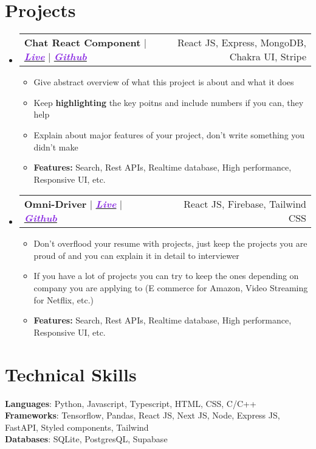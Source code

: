 \documentclass[a4paper,11pt]{article}
\makeatletter
\newcommand{\resumeItem}[1]{
  \item\small{
    {#1 \vspace{-2pt}}
  }
}
\newcommand{\resumeProjectHeading}[2]{
    \item
    \begin{tabular*}{1\textwidth}{l@{\extracolsep{\fill}}r}
      \small#1 & #2 \\
    \end{tabular*}\vspace{-7pt}
}
\newcommand{\resumeSubHeadingListStart}{\begin{itemize}[leftmargin=0in, label={}]}
\newcommand{\resumeSubHeadingListEnd}{\end{itemize}}
\newcommand{\resumeItemListStart}{\begin{itemize}[leftmargin=0.15in, nosep]}
\newcommand{\resumeItemListEnd}{\end{itemize}\vspace{-2pt}}
\makeatother
\begin{document}
\vspace{-18pt}
\section{\Large{Projects}}
    \resumeSubHeadingListStart
      \resumeProjectHeading
          {\textbf{\large{Chat React Component}} $|$ \emph{\href{https://google.com/}{\textcolor{BlueViolet}{\textbf{Live}}}} $|$ \emph{\href{https://github.com/}{\textcolor{BlueViolet}{\textbf{Github}}}}}{React JS, Express, MongoDB, Chakra UI, Stripe}
          \resumeItemListStart
            \resumeItem{Give abstract overview of what this project is about and what it does}
            \resumeItem{Keep \textbf{highlighting} the key poitns and include numbers if you can, they help}
            \resumeItem{Explain about major features of your project, don't write something you didn't make}
            \resumeItem{\textbf{Features:} Search, Rest APIs, Realtime database, High performance, Responsive UI, etc. }
          \resumeItemListEnd
          
    \resumeProjectHeading
          {\textbf{\large{Omni-Driver}} $|$ \emph{\href{https://google.com/}{\textcolor{BlueViolet}{\textbf{Live}}}} $|$ \emph{\href{https://github.com/}{\textcolor{BlueViolet}{\textbf{Github}}}}}{React JS, Firebase, Tailwind CSS}
          \resumeItemListStart
            \resumeItem{Don't overflood your resume with projects, just keep the projects you are proud of and you can explain it in detail to interviewer}
            \resumeItem{If you have a lot of projects you can try to keep the ones depending on company you are applying to (E commerce for Amazon, Video Streaming for Netflix, etc.)}
            \resumeItem{\textbf{Features:} Search, Rest APIs, Realtime database, High performance, Responsive UI, etc. }
          \resumeItemListEnd
          
    \resumeSubHeadingListEnd


\section{\Large{Technical Skills}}
 \begin{itemize}[leftmargin=0.15in, label={}]
    \small{\item{
     \textbf{Languages}{: Python, Javascript, Typescript, HTML, CSS, C/C++} \\
     \textbf{Frameworks}{: Tensorflow, Pandas, React JS, Next JS, Node, Express JS, FastAPI, Styled components, Tailwind} \\
     \textbf{Databases}{: SQLite, PostgresQL, Supabase} \\
    }}
 \end{itemize}
\end{document}
